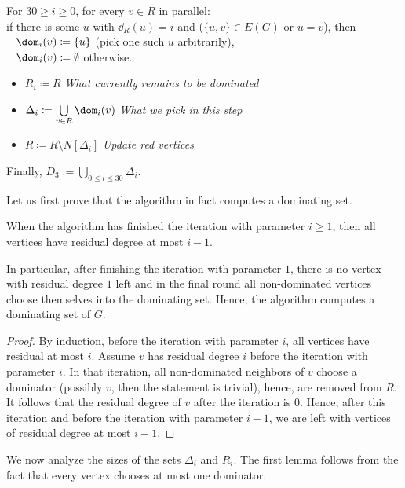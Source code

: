\begin{tcolorbox}[colback=red!5!white,colframe=red!50!black]
  For $30\geq i\geq 0$,  for every $v\in R$ in parallel:\\[2mm]
  if there is some $u$ with $\dd_R(u)=i$ and ($\{u,v\}\in E(G)$ or $u=v$), then\\
  \mbox{ } $\dom_i(v)\coloneqq \{u\}$ (pick one such $u$ arbitrarily),\\
  \mbox{ } $\dom_i(v)\coloneqq \emptyset$ otherwise.
  \begin{itemize}
    \item $R_i \coloneqq R$ \hfill \textit{\small What currently remains to be dominated}
    \item $\Delta_i \coloneqq \bigcup\limits_{v\in R} \dom_i(v)$ \hfill \textit{\small What we pick in this step}
    \item $R \coloneqq R \setminus N[\Delta_{i}]$ \hfill \textit{\small Update red vertices}
  \end{itemize}
  Finally, $D_3:=  \bigcup\limits_{0\le i\le 30} \Delta_i$.
\end{tcolorbox}

\smallskip
Let us first prove that the algorithm in fact computes a dominating set.
\begin{lemma}\label{lem:correctness}
  When the algorithm has finished the iteration with parameter
  $i\geq 1$, then all vertices have residual degree at most $i-1$.
\end{lemma}

In particular, after finishing the iteration with parameter $1$, there
is no vertex with residual degree $1$ left and in the final round all
non-dominated vertices choose themselves into the dominating
set. Hence, the algorithm computes a dominating set of $G$.

\begin{proof}
  By induction, before the iteration with parameter $i$, all vertices
  have residual at most $i$. Assume $v$ has residual degree $i$ before
  the iteration with parameter $i$.  In that iteration, all
  non-dominated neighbors of $v$ choose a dominator (possibly $v$, then
  the statement is trivial),
  hence, are removed from $R$. It follows that the residual degree of $v$ after
  the iteration is $0$. Hence, after this iteration and before the
  iteration with parameter $i-1$, we are left with vertices of
  residual degree at most $i-1$.
\end{proof}

We now analyze the sizes of the sets $\Delta_i$ and $R_i$. The first
lemma follows from the fact that every vertex chooses at most one
dominator.

